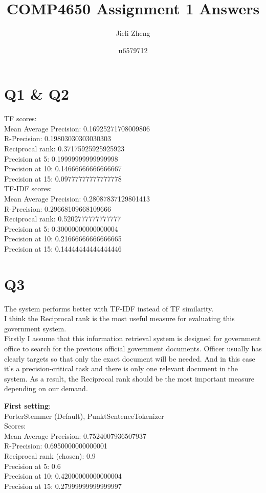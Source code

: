 \documentclass{article}
\title{COMP4650 Assignment 1 Answers}
\author{Jieli Zheng}
\date{u6579712}
\begin{document}
\maketitle

\section*{Q1 \& Q2}

TF scores:\\
Mean Average Precision: 0.16925271708009806\\
R-Precision: 0.19803030303030303\\
Reciprocal rank: 0.37175925925925923\\
Precision at 5: 0.19999999999999998\\
Precision at 10: 0.14666666666666667\\
Precision at 15: 0.09777777777777778\\

TF-IDF scores:\\
Mean Average Precision: 0.28087837129801413\\
R-Precision: 0.29668109668109666\\
Reciprocal rank: 0.5202777777777777\\
Precision at 5: 0.30000000000000004\\
Precision at 10: 0.21666666666666665\\
Precision at 15: 0.14444444444444446\\

\section*{Q3}
The system performs better with TF-IDF instead of TF similarity.\\
I think the Reciprocal rank is the most useful measure for evaluating this 
government system.\\
Firstly I assume that this information retrieval system is designed for government 
office to search for the previous official government documents. Officer usually 
has clearly targets so that only the exact document will be needed. And in this 
case it's a precision-critical task and there is only one relevant document in 
the system. As a result, the Reciprocal rank should be the most important 
measure depending on our demand.


\textbf{First setting}:\\
PorterStemmer (Default), PunktSentenceTokenizer\\
Scores:\\
Mean Average Precision: 0.7524007936507937\\
R-Precision: 0.6950000000000001\\
Reciprocal rank (chosen): 0.9\\
Precision at 5: 0.6\\
Precision at 10: 0.42000000000000004\\
Precision at 15: 0.27999999999999997\\
\end{document}
